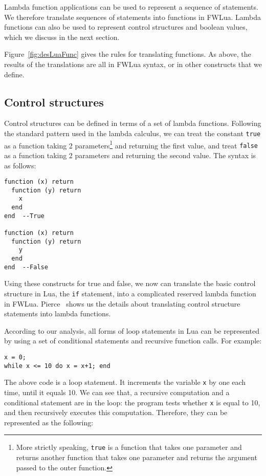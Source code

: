 
Lambda function applications can be used to represent a sequence of  statements. We therefore translate sequences of statements into functions in FWLua. Lambda functions can also be used to represent control structures and boolean values, which we discuss in the next section.

Figure~\ref{fig:desLuaFunc} gives the rules for translating functions. As above, the results of the translations are all in FWLua syntax, or in other constructs that we define.

\subsection{Control structures}
Control structures can be defined in terms of a set of lambda functions. 
Following the standard pattern used in the lambda calculus,
we can treat the constant {\tt true} as a function taking 2 parameters\footnote{
  More strictly speaking, {\tt true} is a function that takes one parameter
  and returns another function that takes one parameter and returns
  the argument passed to the outer function.
}
and returning the first value, and treat {\tt false} as a function taking 2 parameters and returning the second value. The syntax is as follows:

\begin{verbatim}
function (x) return 
  function (y) return 
    x
  end
end  --True

function (x) return 
  function (y) return 
    y
  end
end  --False
\end{verbatim}

Using these constructs for true and false, we now can translate the basic control structure in Lua, the {\tt if} statement, into a complicated reserved lambda function in FWLua. Pierce~\cite{TAPL} shows us the details about translating control structure statements into lambda functions.

According to our analysis, all forms of loop statements in Lua can be represented by using a set of conditional statements and recursive function calls. For example:

\begin{verbatim}
x = 0;
while x <= 10 do x = x+1; end
\end{verbatim}

The above code is a loop statement. It increments the variable {\tt x} by one each time, until it equals 10. We can see that, a recursive computation and a conditional statement are in the loop: the program tests whether {\tt x} is equal to 10, and then recursively executes this computation. Therefore, they can be represented as the following:

